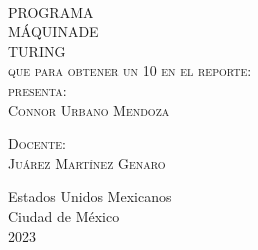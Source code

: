 \begin{titlepage}
\begin{minipage}[c][0.81\textheight][t]{0.75\textwidth}
\begin{center}
      {\color{red}{\large\scshape Titulo del Reporte }}\\[.2in]

      \vspace{2cm}            

      \textsc{\LARGE P\hspace{0.5cm}R\hspace{0.5cm}O\hspace{0.5cm}G\hspace{0.5cm}R\hspace{0.5cm}A\hspace{0.5cm}M\hspace{0.5cm}A\hspace{0.5cm}}\\[1cm]
      \textsc{\LARGE M\hspace{0.5cm}Á\hspace{0.5cm}Q\hspace{0.5cm}U\hspace{0.5cm}I\hspace{0.5cm}N\hspace{0.5cm}A\hspace{0.5cm}\hspace{0.5cm}D\hspace{0.5cm}E}\\[1cm]
      \textsc{\LARGE\hspace{0.5cm}T\hspace{0.5cm}U\hspace{0.5cm}R\hspace{0.5cm}I\hspace{0.5cm}N\hspace{0.5cm}G}
      \\[1cm]
      \textsc{\large que para obtener un 10 en el reporte:}\\[0.2cm]
      
      {\color{red}\textsc{\large presenta:}}\\[0.2cm]
      \textsc{\large {Connor Urbano Mendoza}}\\[1cm]          

      \vspace{0.5cm}

      {\large\scshape 
        {\color{red}Docente:}\\[0.3cm] {Juárez Martínez Genaro}}\\[.2in]

      \vspace{1cm}

      \large{Estados Unidos Mexicanos\\ 
        Ciudad de México\\
        2023}
    \end{center}
  \end{minipage}
\end{titlepage}
